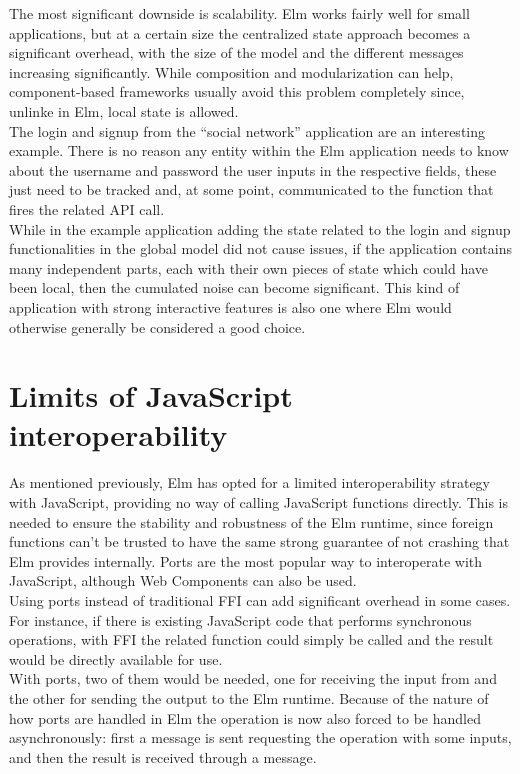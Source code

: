 The most significant downside is scalability. Elm works fairly well for small applications, but at a certain size the centralized state approach becomes a significant overhead, with the size of the model and the different messages increasing significantly. While composition and modularization can help, component-based frameworks usually avoid this problem completely since, unlinke in Elm, local state is allowed.\\

The login and signup from the  ``social network'' application are an interesting example. There is no reason any entity within the Elm application needs to know about the username and password the user inputs in the respective fields, these just need to be tracked and, at some point, communicated to the function that fires the related API call.\\

While in the example application adding the state related to the login and signup functionalities in the global model did not cause issues, if the application contains many independent parts, each with their own pieces of state which could have been local, then the cumulated noise can become significant. This kind of application with strong interactive features is also one where Elm would otherwise generally be considered a good choice.

\section{Limits of JavaScript interoperability}

As mentioned previously, Elm has opted for a limited interoperability strategy with JavaScript, providing no way of calling JavaScript functions directly. This is needed to ensure the stability and robustness of the Elm runtime, since foreign functions can't be trusted to have the same strong guarantee of not crashing that Elm provides internally. Ports are the most popular way to interoperate with JavaScript, although Web Components can also be used.\\

Using ports instead of traditional FFI can add significant overhead in some cases. For instance, if there is existing JavaScript code that performs synchronous operations, with FFI the related function could simply be called and the result would be directly available for use.\\
With ports, two of them would be needed, one for receiving the input from and the other for sending the output to the Elm runtime. Because of the nature of how ports are handled in Elm the operation is now also forced to be handled asynchronously: first a message is sent requesting the operation with some inputs, and then the result is received through a message.\\

